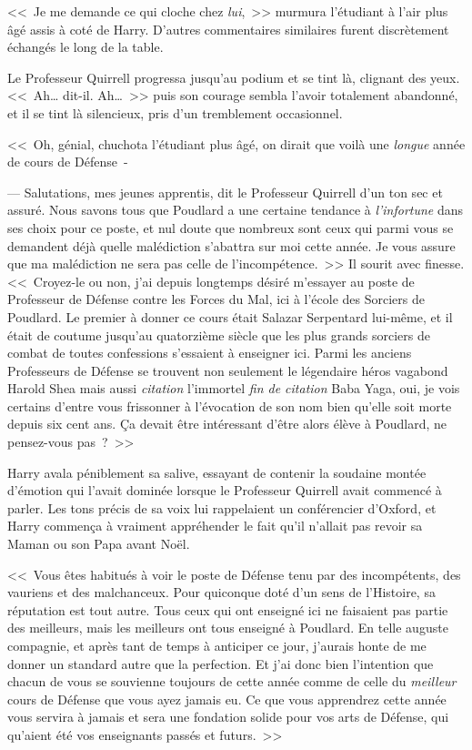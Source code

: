 <<~Je me demande ce qui cloche chez \emph{lui},~>> murmura l'étudiant à l'air plus âgé assis à coté de Harry. D'autres commentaires similaires furent discrètement échangés le long de la table.

Le Professeur Quirrell progressa jusqu'au podium et se tint là, clignant des yeux. <<~Ah… dit-il. Ah…~>> puis son courage sembla l'avoir totalement abandonné, et il se tint là silencieux, pris d'un tremblement occasionnel.

<<~Oh, génial, chuchota l'étudiant plus âgé, on dirait que voilà une \emph{longue} année de cours de Défense~-

--- Salutations, mes jeunes apprentis, dit le Professeur Quirrell d'un ton sec et assuré. Nous savons tous que Poudlard a une certaine tendance à \emph{l'infortune} dans ses choix pour ce poste, et nul doute que nombreux sont ceux qui parmi vous se demandent déjà quelle malédiction s'abattra sur moi cette année. Je vous assure que ma malédiction ne sera pas celle de l'incompétence.~>> Il sourit avec finesse. <<~Croyez-le ou non, j'ai depuis longtemps désiré m'essayer au poste de Professeur de Défense contre les Forces du Mal, ici à l'école des Sorciers de Poudlard. Le premier à donner ce cours était Salazar Serpentard lui-même, et il était de coutume jusqu'au quatorzième siècle que les plus grands sorciers de combat de toutes confessions s'essaient à enseigner ici. Parmi les anciens Professeurs de Défense se trouvent non seulement le légendaire héros vagabond Harold Shea mais aussi \emph{citation} l'immortel \emph{fin de citation} Baba Yaga, oui, je vois certains d'entre vous frissonner à l'évocation de son nom bien qu'elle soit morte depuis six cent ans. Ça devait être intéressant d'être alors élève à Poudlard, ne pensez-vous pas~?~>>

Harry avala péniblement sa salive, essayant de contenir la soudaine montée d'émotion qui l'avait dominée lorsque le Professeur Quirrell avait commencé à parler. Les tons précis de sa voix lui rappelaient un conférencier d'Oxford, et Harry commença à vraiment appréhender le fait qu'il n'allait pas revoir sa Maman ou son Papa avant Noël.

<<~Vous êtes habitués à voir le poste de Défense tenu par des incompétents, des vauriens et des malchanceux. Pour quiconque doté d'un sens de l'Histoire, sa réputation est tout autre. Tous ceux qui ont enseigné ici ne faisaient pas partie des meilleurs, mais les meilleurs ont tous enseigné à Poudlard. En telle auguste compagnie, et après tant de temps à anticiper ce jour, j'aurais honte de me donner un standard autre que la perfection. Et j'ai donc bien l'intention que chacun de vous se souvienne toujours de cette année comme de celle du \emph{meilleur} cours de Défense que vous ayez jamais eu. Ce que vous apprendrez cette année vous servira à jamais et sera une fondation solide pour vos arts de Défense, qui qu'aient été vos enseignants passés et futurs.~>>


